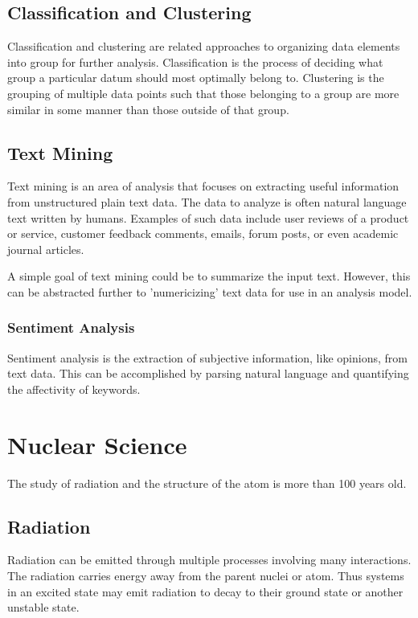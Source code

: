 \documentclass[12pt]{article}
\begin{document}
\begin{doublespacing}
\subsection{Classification and Clustering}
Classification and clustering are related approaches to organizing data elements into group for further analysis.
Classification is the process of deciding what group a particular datum should most optimally belong to.
Clustering is the grouping of multiple data points such that those belonging to a group are more similar in some manner than those outside of that group.

\subsection{Text Mining}
Text mining is an area of analysis that focuses on extracting useful information from unstructured plain text data.
The data to analyze is often natural language text written by humans.
Examples of such data include user reviews of a product or service, customer feedback comments, emails, forum posts, or even academic journal articles.

A simple goal of text mining could be to summarize the input text.
However, this can be abstracted further to 'numericizing' text data for use in an analysis model.

\subsubsection{Sentiment Analysis}
Sentiment analysis is the extraction of subjective information, like opinions, from text data.
This can be accomplished by parsing natural language and quantifying the affectivity of keywords.


\pagebreak
\section{Nuclear Science}
The study of radiation and the structure of the atom is more than 100 years old.

\subsection{Radiation}
Radiation can be emitted through multiple processes involving many interactions. The radiation carries energy away from the parent nuclei or atom. Thus systems in an excited state may emit radiation to decay to their ground state or another unstable state. 


\end{doublespacing}
\end{document}
